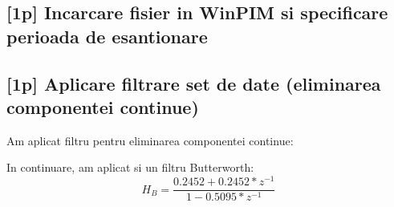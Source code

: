 \documentclass[12pt,english]{article}
\begin{document}
\subsection {[1p] Incarcare fisier in WinPIM si specificare perioada de esantionare }
\begin{center}
\end{center}

\subsection {[1p] Aplicare filtrare set de date (eliminarea componentei continue) }
Am aplicat filtru pentru eliminarea componentei continue:
\begin{center}
\end{center}

In continuare, am aplicat si un filtru Butterworth:
\begin{equation*}
  H_{B} =\frac{0.2452+0.2452*z^{-1}}{1-0.5095*z^{-1}}
\end{equation*}

\begin{center}
\end{center}
\end{document}

